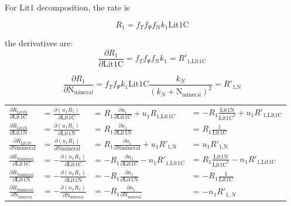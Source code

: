 \documentclass[12pt, a4paper]{article}
\begin{document}
For Lit1 decomposition, the rate is

\begin{equation}
R_1 = f_T f_\Psi f_\text{N} k_1 \text{Lit1C} 
\end{equation}

the derivatives are:
\begin{equation}
\frac{\partial R_1}{\partial \text{Lit1C}} = f_T f_\Psi f_\text{N} k_1 = R'_\text{1,Lit1C}
\end{equation}

\begin{equation}
\frac{\partial R_1}{\partial \text{N}_\text{mineral}} = f_T f_\Psi k_1 \text{Lit1C} \frac{k_N}{(k_N + \text{N}_\text{mineral})^2} = R'_\text{1,N}
\end{equation}

\begin{tabular}{ llll}
$\frac{\partial R_\text{Lit1N}}{\partial \text{Lit1C}}$ &= $\frac{\partial (u_1R_1)}{\partial \text{Lit1C}}$ &= $R_1 \frac{\partial u_1}{\partial \text{Lit1C}}+ u_1R_\text{1,Lit1C}$ &= $-R_1 \frac{\text{Lit1N}}{ \text{Lit1C}^2}+ u_1R'_\text{1,Lit1C}$  \\
$\frac{\partial R_\text{Lit1N}}{\partial \text{Lit1N}}$ &= $\frac{\partial (u_1R_1)}{\partial \text{Lit1N}}$ &= $R_1 \frac{\partial u_1}{\partial \text{Lit1N}}$ &= $R_1 \frac{1}{ \text{Lit1C}} $\\ 
$\frac{\partial R_\text{Lit1N}}{\partial \text{Nmineral}}$ &= $\frac{\partial (u_1R_1)}{\partial \text{Nmineral}}$ &= $R_1 \frac{\partial u_1}{\partial \text{Nmineral}} + u_1 R'_\text{1,N}$ &= $u_1R'_\text{1,N}$  \\
$\frac{\partial R_\text{Nmineral}}{\partial \text{Lit1C}}$ &= $-\frac{\partial (n_1R_1)}{\partial \text{Lit1C}}$ &= $-R_1 \frac{\partial n_1}{\partial \text{Lit1C}}- n_1R'_\text{1,Lit1C}$ &= $R_1 \frac{\text{Lit1N}}{ \text{Lit1C}^2} - n_1R'_\text{1,Lit1C} $ \\
$\frac{\partial R_\text{Nmineral}}{\partial \text{Lit1N}}$ &= $-\frac{\partial (n_1R_1)}{\partial \text{Lit1N}}$ &= $-R_1 \frac{\partial n_1}{\partial \text{Lit1N}}$ &= $-R_1 \frac{1}{ \text{Lit1C}}$ \\
$\frac{\partial R_\text{Nmineral}}{\partial \text{N}_\text{mineral}}$ &= $-\frac{\partial (n_1R_1)}{\partial \text{N}_\text{mineral}}$ & = $-R_1 \frac{\partial n_1}{\partial \text{N}_\text{mineral}}$ &= $-n_1R'_{1,N}$  \\
\end{tabular}
\end{document}
